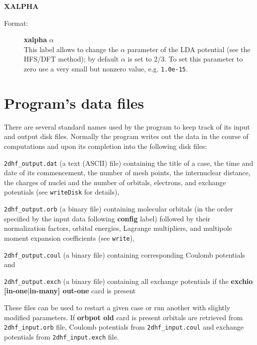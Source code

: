 \documentclass[10pt,a4paper]{article}
\begin{document}
\begin{description}
\item \textbf{XALPHA}
\begin{description}
\item[Format:] \textbf{xalpha} $\alpha$ \\ This label allows to change the $\alpha$
  parameter of the LDA potential (see the HFS/DFT method); by default $\alpha$ is set
  to 2/3. To set this parameter to zero use a very small but nonzero value, e.g. \texttt{1.0e-15}.
\end{description}
\end{description}

\newpage

\section{Program's data files}

There are several standard names used by the program to keep track of its
input and output disk files. Normally the program writes out the data in
the course of computations and upon its completion into the following disk
files:
\begin{description}

\item \texttt{2dhf\_output.dat} (a text (ASCII) file) containing the title
  of a case, the time and date of its commencement, the number of mesh
  points, the internuclear distance, the charges of nuclei and the number
  of orbitals, electrons, and exchange potentials (see \texttt{writeDisk}
  for details),

\item \texttt{2dhf\_output.orb} (a binary file) containing molecular orbitals (in the
  order specified by the input data following \textbf{config} label) followed by their
  normalization factors, orbital energies, Lagrange multipliers, and multipole moment
  expansion coefficients (see \texttt{write\*}),

\item \texttt{2dhf\_output.coul} (a binary file) containing
  corresponding Coulomb potentials and

\item \texttt{2dhf\_output.exch} (a binary file) containing all exchange potentials if the
  \textbf{exchio [in-one$|$in-many] out-one} card is present

\end{description}

These files can be used to restart a given case or run another with slightly modified
parameters. If \textbf{orbpot old} card is present orbitals are retrieved from
\texttt{2dhf\-\_in\-put\-.orb} file, Coulomb potentials from \texttt{2dhf\_input.coul} and
exchange potentials from \texttt{2dhf\_input.exch} file.
\end{document}

